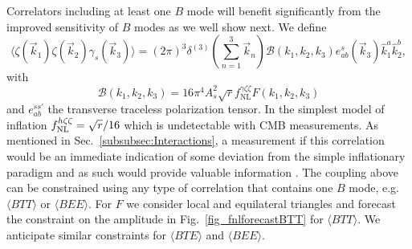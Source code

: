 Correlators including at least one $B$ mode will benefit significantly from the improved sensitivity of $B$ modes as we well show next. We define \cite{Meerburg2016}
\begin{equation}
\langle \zeta(\vec{k}_1)\zeta(\vec{k}_2)\gamma_s(\vec{k}_3) \rangle = (2\pi)^3  \delta^{(3)} \left(\sum_{n=1}^3\vec{k}_n\right) \mathcal{B}(k_1,k_2,k_3) e_{ab}^{s}(\vec{k}_3)\hat{k}_1^a \hat{k}_2^b, 
\end{equation}
with 
\begin{equation}
\mathcal{B}(k_1,k_2,k_3)= 16 \pi^4 A_s^2 \sqrt{r}f_\mathrm{NL}^{\gamma\zeta\zeta} F(k_1,k_2,k_3)
\end{equation}
and $e_{ab}^{ss'}$ the transverse traceless polarization tensor. 
In the simplest model of inflation $f^{h \zeta \zeta}_{\rm NL} = \sqrt{r}/16$ \cite{Maldacena:2002vr,Maldacena:2011nz} which is undetectable with CMB measurements. As mentioned in Sec.~\ref{subsubsec:Interactions}, a measurement if this correlation would be an immediate indication of some deviation from the simple inflationary paradigm and as such would provide valuable information \cite{2016arXiv160508424B,2016JCAP...02..017D}. The coupling above can be constrained using any type of correlation that contains one $B$ mode, e.g. $\langle BTT \rangle$ or $\langle BEE\rangle$. For $F$ we consider local and equilateral triangles and forecast the constraint on the amplitude in Fig.~\ref{fig_fnlforecastBTT} for $\langle BTT\rangle$. We anticipate similar constraints for $\langle BTE\rangle $ and $\langle BEE\rangle$. 


